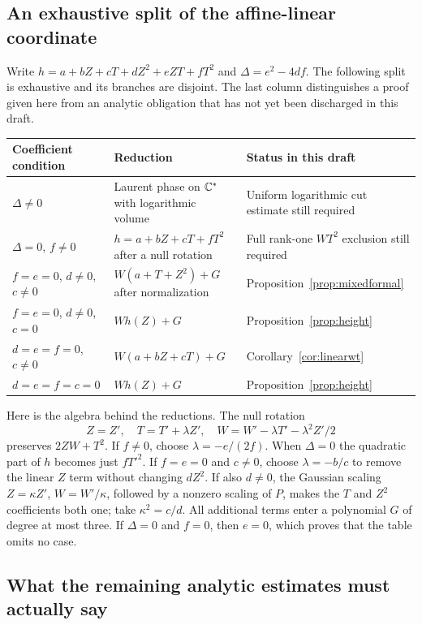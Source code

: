 \subsection{An exhaustive split of the affine-linear coordinate}\label{sec:wsplit}

Write $h=a+bZ+cT+dZ^2+eZT+fT^2$ and
$\Delta=e^2-4df$. The following split is exhaustive and its branches
are disjoint. The last column distinguishes a proof given here from
an analytic obligation that has not yet been discharged in this draft.

\begin{center}\small
\begin{tabular}{@{}p{}p{}p{}@{}}
\toprule
Coefficient condition & Reduction & Status in this draft\\
\midrule
$\Delta\ne0$ & Laurent phase on $\mathbb C^*$ with logarithmic volume &
Uniform logarithmic cut estimate still required\\[3pt]
$\Delta=0$, $f\ne0$ & $h=a+bZ+cT+fT^2$ after a null rotation &
Full rank-one $WT^2$ exclusion still required\\[3pt]
$f=e=0$, $d\ne0$, $c\ne0$ &
$W(a+T+Z^2)+G$ after normalization &
Proposition~\ref{prop:mixedformal}\\[3pt]
$f=e=0$, $d\ne0$, $c=0$ & $Wh(Z)+G$ &
Proposition~\ref{prop:height}\\[3pt]
$d=e=f=0$, $c\ne0$ & $W(a+bZ+cT)+G$ &
Corollary~\ref{cor:linearwt}\\[3pt]
$d=e=f=c=0$ & $Wh(Z)+G$ &
Proposition~\ref{prop:height}\\
\bottomrule
\end{tabular}
\end{center}

Here is the algebra behind the reductions. The null rotation
\[
 Z=Z',\quad T=T'+\lambda Z',\quad
 W=W'-\lambda T'-\lambda^2Z'/2
\]
preserves $2ZW+T^2$. If $f\ne0$, choose $\lambda=-e/(2f)$.
When $\Delta=0$ the quadratic part of $h$ becomes just $fT'^2$.
If $f=e=0$ and $c\ne0$, choose $\lambda=-b/c$ to remove the
linear $Z$ term without changing $dZ^2$. If also $d\ne0$, the
Gaussian scaling $Z=\kappa Z'$, $W=W'/\kappa$, followed by a
nonzero scaling of $P$, makes the $T$ and $Z^2$ coefficients both
one; take $\kappa^2=c/d$. All additional terms enter a polynomial
$G$ of degree at most three. If $\Delta=0$ and $f=0$, then $e=0$,
which proves that the table omits no case.

\subsection{What the remaining analytic estimates must actually say}
\label{sec:analyticgates}

